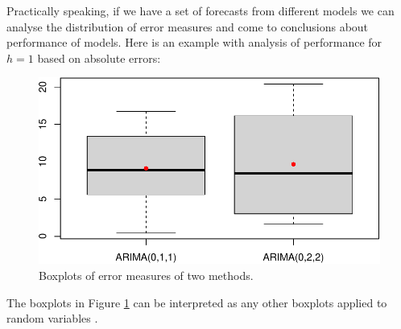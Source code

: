 \documentclass[]{book}
\newenvironment{Shaded}{\begin{snugshade}}{\end{snugshade}}
\newcommand{\DataTypeTok}[1]{\textcolor[rgb]{0.13,0.29,0.53}{#1}}
\newcommand{\DecValTok}[1]{\textcolor[rgb]{0.00,0.00,0.81}{#1}}
\newcommand{\KeywordTok}[1]{\textcolor[rgb]{0.13,0.29,0.53}{\textbf{#1}}}
\newcommand{\NormalTok}[1]{#1}
\newcommand{\OperatorTok}[1]{\textcolor[rgb]{0.81,0.36,0.00}{\textbf{#1}}}
\newcommand{\StringTok}[1]{\textcolor[rgb]{0.31,0.60,0.02}{#1}}
\theoremstyle{definition}
\theoremstyle{definition}
\theoremstyle{definition}
\theoremstyle{definition}
\theoremstyle{remark}
\begin{document}
Practically speaking, if we have a set of forecasts from different models we can analyse the distribution of error measures and come to conclusions about performance of models. Here is an example with analysis of performance for \(h=1\) based on absolute errors:

\begin{Shaded}
\end{Shaded}

\begin{figure}
\centering
\includegraphics{Svetunkov--2022----ADAM_files/figure-latex/roExample02-1.pdf}
\caption{\label{fig:roExample02}Boxplots of error measures of two methods.}
\end{figure}

The boxplots in Figure \ref{fig:roExample02} can be interpreted as any other boxplots applied to random variables \citep[see, for example, discussion in Section 2.2 of][]{SvetunkovSBA}.
\end{document}
